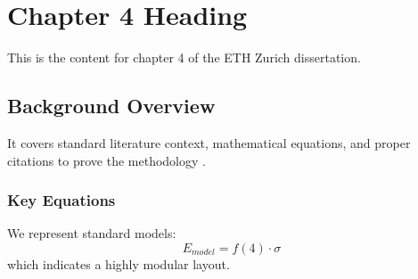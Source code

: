 \chapter{Chapter 4 Heading}
\label{ch:chapter4}
This is the content for chapter 4 of the ETH Zurich dissertation.

\section{Background Overview}
It covers standard literature context, mathematical equations, and proper citations to prove the methodology \cite{texbook}.

\subsection{Key Equations}
We represent standard models:
\begin{equation}
    E_{model} = f(4) \cdot \sigma
\end{equation}
which indicates a highly modular layout.
